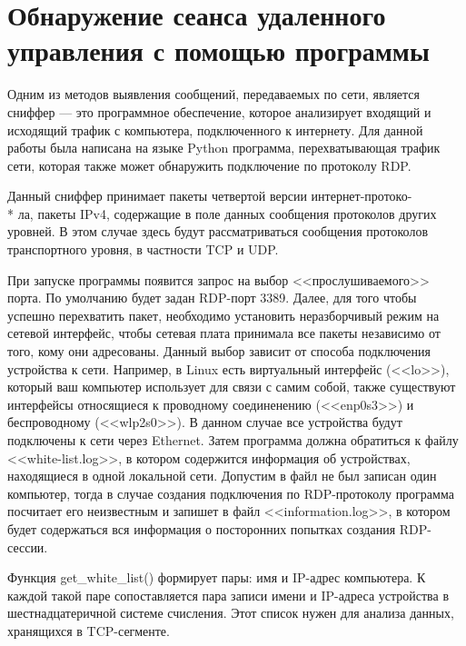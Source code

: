 \documentclass[bachelor, och, coursework]{SCWorks}
\begin{document}
    
  \section{Обнаружение сеанса удаленного управления с помощью программы}
  
  Одним из методов выявления сообщений, передаваемых по сети, является сниффер --- это программное обеспечение, которое анализирует входящий и исходящий трафик с компьютера, подключенного к
  интернету. Для данной работы была написана на языке Python программа, перехватывающая трафик сети, которая также может обнаружить подключение по
  протоколу RDP.
    
  Данный сниффер принимает пакеты четвертой версии интернет-протоко- \\* ла, пакеты IPv4, содержащие в поле данных сообщения протоколов других уровней. В
  этом случае здесь будут рассматриваться сообщения протоколов транспортного уровня, в частности TCP и UDP.
    
  При запуске программы появится запрос на выбор <<прослушиваемого>> порта. По умолчанию будет задан RDP-порт 3389. Далее, для того чтобы успешно
  перехватить пакет, необходимо установить неразборчивый режим на сетевой интерфейс, чтобы сетевая плата принимала все пакеты независимо от того,
  кому они адресованы. Данный выбор
  зависит от способа подключения устройства к сети. Например, в Linux есть виртуальный интерфейс (<<lo>>), который ваш компьютер использует для связи с
  самим собой, также существуют интерфейсы относящиеся к проводному соединенению (<<enp0s3>>) и беспроводному (<<wlp2s0>>). В данном случае все устройства
  будут подключены к сети через Ethernet. Затем программа должна обратиться к файлу <<white-list.log>>, в котором содержится информация об устройствах,
  находящиеся в одной локальной сети. Допустим в файл не был записан один компьютер, тогда в случае создания подключения по RDP-протоколу программа посчитает его
  неизвестным и запишет в файл <<information.log>>, в котором будет содержаться вся информация о посторонних попытках создания RDP-сессии.

    Функция get_white_list() формирует пары: имя и IP-адрес компьютера. К каждой такой паре сопоставляется пара записи имени и IP-адреса устройства в
    шестнадцатеричной системе счисления. Этот список нужен для анализа данных, хранящихся в TCP-сегменте.
\end{document}
